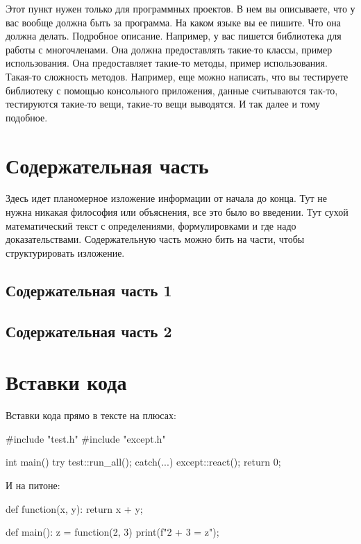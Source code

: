 \documentclass{article}
\begin{document}
Этот пункт нужен только для программных проектов. В нем вы описываете, что у вас вообще должна быть за программа. На каком языке вы ее пишите. Что она должна делать. Подробное описание. Например, у вас пишется библиотека для работы с многочленами. Она должна предоставлять такие-то классы, пример использования. Она предоставляет такие-то методы, пример использования. Такая-то сложность методов. Например, еще можно написать, что вы тестируете библиотеку с помощью консольного приложения, данные считываются так-то, тестируются такие-то вещи, такие-то вещи выводятся. И так далее и тому подобное.

\section{Содержательная часть}

Здесь идет планомерное изложение информации от начала до конца. Тут не нужна никакая философия или объяснения, все это было во введении. Тут сухой математический текст с определениями, формулировками и где надо доказательствами. Содержательную часть можно бить на части, чтобы структурировать изложение.

\subsection{Содержательная часть 1}

\subsection{Содержательная часть 2}


\section{Вставки кода}

Вставки кода прямо в тексте на плюсах:
\begin{cppcode}
#include "test.h"
#include "except.h"

int main() {
  try {
    test::run_all();
  } catch(...) {
    except::react();
  }
  return 0;
}
\end{cppcode}

И на питоне:
\begin{pythoncode}
def function(x, y):
  return x + y;
  
def main():
  z = function(2, 3)
  print(f"2 + 3 = {z}");
\end{pythoncode}



\end{document}

